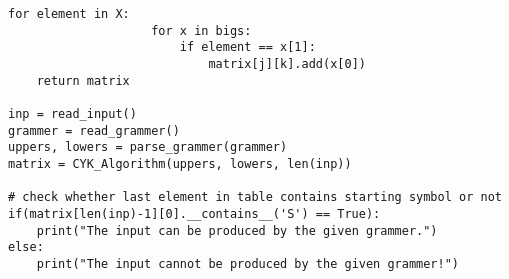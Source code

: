 \documentclass[a4paper,11pt]{article}
\theoremstyle{mytheor}
\newcommand{\insertcode}[2]{\begin{itemize}\item[]\end{itemize}} %
\begin{document}
\begin{lstlisting}[caption=https://github.com/Mohammad-Rahmdel/cyk\_algorithm]
				for element in X:
					for x in bigs:
						if element == x[1]:
							matrix[j][k].add(x[0])
	return matrix

inp = read_input()
grammer = read_grammer()
uppers, lowers = parse_grammer(grammer)
matrix = CYK_Algorithm(uppers, lowers, len(inp))

# check whether last element in table contains starting symbol or not
if(matrix[len(inp)-1][0].__contains__('S') == True):        
	print("The input can be produced by the given grammer.")
else:
	print("The input cannot be produced by the given grammer!")

\end{lstlisting}



\end{document}
